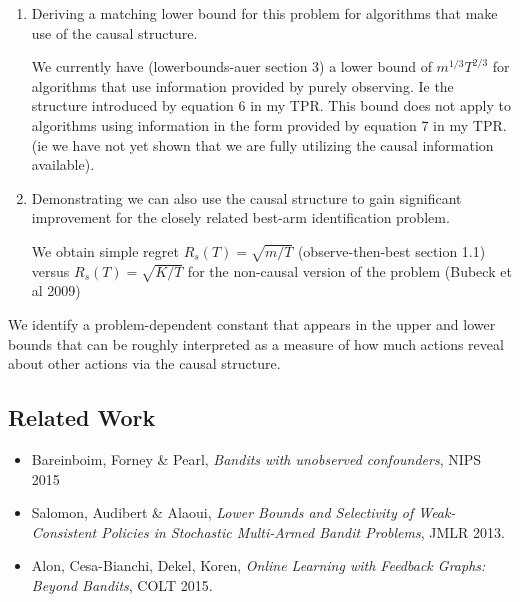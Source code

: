 \documentclass[wcp]{jmlr}
\begin{document}
\begin{enumerate}
\begin{figure}[H]
\begin{tikzpicture}[->,>=stealth',shorten >=1pt,auto,node distance=1cm,
  thick,main node/.style={observed}, hidden/.style={empty},tg/.style={target}]
\end{tikzpicture}
\end{figure}
	
	\item Deriving a matching lower bound for this problem for algorithms that make use of the causal structure.
	
	We currently have (lowerbounds-auer section 3) a lower bound of $m^{1/3}T^{2/3}$ for algorithms that use information provided by purely observing. Ie the structure introduced by equation 6 in my TPR. This bound does not apply to algorithms using information in the form provided by equation 7 in my TPR. (ie we have not yet shown that we are fully utilizing the causal information available).
	
	\item Demonstrating we can also use the causal structure to gain significant improvement for the closely related best-arm identification problem.
	
	We obtain simple regret $R_s(T) = \sqrt{m/T}$ (observe-then-best section 1.1) versus $R_s(T) = \sqrt{K/T}$ for the non-causal version of the problem (Bubeck et al 2009)
	
	
\end{enumerate}

We identify a problem-dependent constant that appears in the upper and lower 
bounds that can be roughly interpreted as a measure of how much actions reveal
about other actions via the causal structure.

\subsection{Related Work}
\label{sub:related_work}

\begin{itemize}
	\item Bareinboim, Forney \& Pearl, \emph{Bandits with unobserved 
			confounders}, NIPS 2015
	\item Salomon, Audibert \& Alaoui, \emph{Lower Bounds and Selectivity of 
			Weak-Consistent Policies in Stochastic Multi-Armed Bandit Problems},
			JMLR 2013.
	\item Alon, Cesa-Bianchi, Dekel, Koren, \emph{Online Learning with Feedback
			Graphs: Beyond Bandits}, COLT 2015.
\end{itemize}




\end{document}
